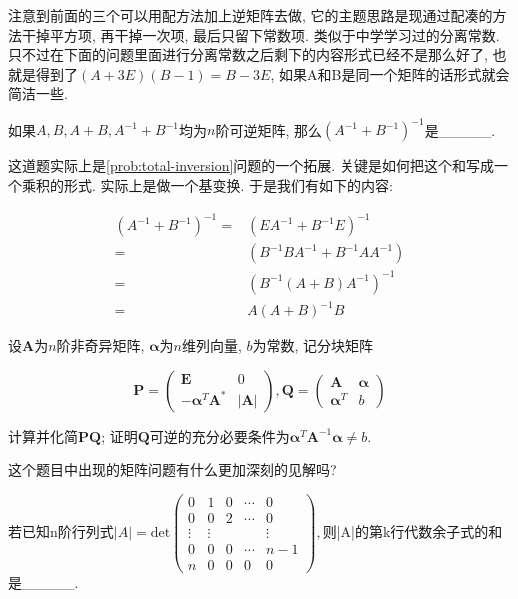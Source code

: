 \begin{sol*}
注意到前面的三个可以用配方法加上逆矩阵去做, 它的主题思路是现通过配凑的方法干掉平方项, 再干掉一次项, 最后只留下常数项. 类似于中学学习过的分离常数.
只不过在下面的问题里面进行分离常数之后剩下的内容形式已经不是那么好了, 也就是得到了$(A+3E)(B-1)=B-3E$, 如果A和B是同一个矩阵的话形式就会简洁一些. 
\end{sol*}
\begin{problem}
如果$A,B,A+B,A^{-1}+B^{-1}$均为$n$阶可逆矩阵, 那么$(A^{-1}+B^{-1})^{-1}$是\_\_\_\_\_. 
\end{problem}

\begin{sol*}
这道题实际上是\ref{prob:total-inversion}问题的一个拓展. 关键是如何把这个和写成一个乘积的形式. 实际上是做一个基变换.
于是我们有如下的内容:

\begin{align*}
(A^{-1}+B^{-1})^{-1}= & (EA^{-1}+B^{-1}E)^{-1}\\
= & (B^{-1}BA^{-1}+B^{-1}AA^{-1})\\
= & \left(B^{-1}(A+B)A^{-1}\right)^{-1}\\
= & A(A+B)^{-1}B
\end{align*}
\end{sol*}
\begin{problem}
设$\boldsymbol{A}$为$n$阶非奇异矩阵, $\boldsymbol{\alpha}$为$n$维列向量, $b$为常数,
记分块矩阵

\[
\boldsymbol{P}=\begin{pmatrix}\boldsymbol{E} & 0\\
-\boldsymbol{\alpha}^{T}\boldsymbol{A}^{*} & |\boldsymbol{A}|
\end{pmatrix},\boldsymbol{Q}=\begin{pmatrix}\boldsymbol{A} & \boldsymbol{\alpha}\\
\boldsymbol{\alpha}^{T} & b
\end{pmatrix}
\]

计算并化简$\boldsymbol{PQ}$; 证明$\boldsymbol{Q}$可逆的充分必要条件为$\boldsymbol{\alpha}^{T}\boldsymbol{A}^{-1}\boldsymbol{\alpha}\neq b$.
\end{problem}

\begin{sol*}
这个题目中出现的矩阵问题有什么更加深刻的见解吗?
\end{sol*}
\begin{problem}
若已知n阶行列式$|A|=\text{det}\begin{pmatrix}0 & 1 & 0 & \cdots & 0\\
0 & 0 & 2 & \cdots & 0\\
\vdots & \vdots &  &  & \vdots\\
0 & 0 & 0 & \cdots & n-1\\
n & 0 & 0 & 0 & 0
\end{pmatrix},$则|A|的第k行代数余子式的和是\_\_\_\_\_. 
\end{problem}

